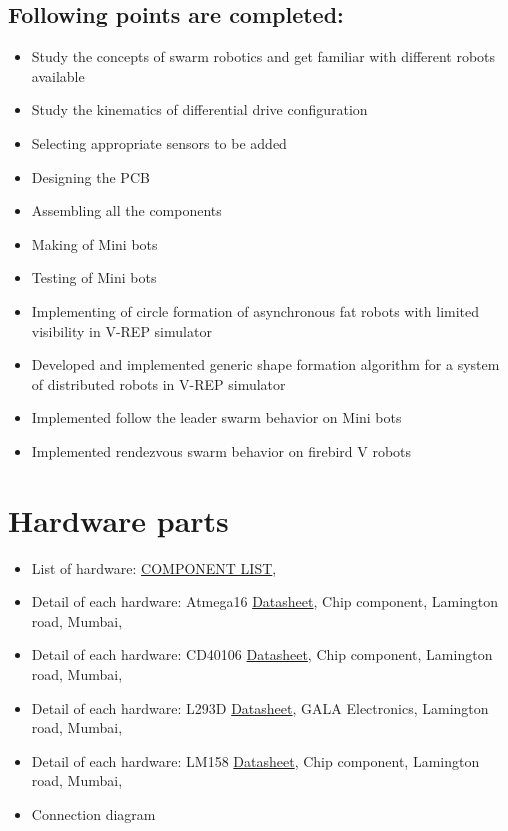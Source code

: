 \documentclass[a4paper,12pt,oneside]{book}
\begin{document}
\subsection*{Following points are completed:}
\begin{itemize}
\item Study the concepts of swarm robotics and get familiar
with different robots available \\
\item Study the kinematics of differential drive configuration \\
\item Selecting appropriate sensors to be added \\
\item Designing the PCB \\
\item Assembling all the components \\
\item Making of Mini bots \\
\item Testing of Mini bots\\
\item Implementing of circle formation of asynchronous fat robots with limited visibility in V-REP simulator\\
\item Developed and implemented generic shape formation algorithm for a system of distributed robots in V-REP simulator\\
\item Implemented follow the leader swarm behavior on Mini bots\\
\item Implemented rendezvous swarm behavior on firebird V robots\\
\end{itemize}

\section{Hardware parts}
\begin{itemize}
  \item List of hardware: \href{./COMPONENT LIST}{COMPONENT LIST},
  \item Detail of each hardware: Atmega16 \href{./datasheet/atmega16.pdf}{Datasheet}, {Chip component, Lamington road, Mumbai}, 
  \item Detail of each hardware: CD40106 \href{./datasheet/CD40106.pdf}{Datasheet}, {Chip component, Lamington road, Mumbai}, 
  \item Detail of each hardware: L293D \href{./datasheet/L293.pdf}{Datasheet}, {GALA Electronics, Lamington road, Mumbai}, 
  \item Detail of each hardware: LM158 \href{./datasheet/lm158-n.pdf}{Datasheet}, {Chip component, Lamington road, Mumbai}, 
  \item Connection diagram
\end{itemize}
\end{document}
